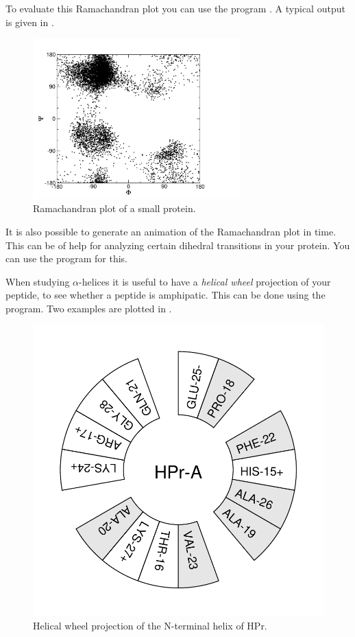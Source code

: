 {To evaluate this Ramachandran plot you can use the program {\tt {}}. 
A typical output is given in .

\begin{figure}
\centerline{
{\includegraphics[width=8cm]{plots/rama}}}
\caption{Ramachandran plot of a small protein.}
\label{fig:rama}
\end{figure}

It is also possible to generate an animation of the Ramachandran plot
in time. This can be of help for analyzing certain dihedral transitions 
in your protein. You can use the program {\tt {}} for this.

When studying $\alpha$-helices 
it is useful to have a {\em helical wheel} projection
of your peptide, to see whether a peptide is amphipatic. This can be done
using the {\tt {}} program. Two examples are 
plotted in .

\begin{figure}
\centerline{\includegraphics[width=\htw]{plots/hpr-wheel}}
\caption{Helical wheel projection of the N-terminal helix of HPr.}
\label{fig:wheel}
\end{figure}

}
